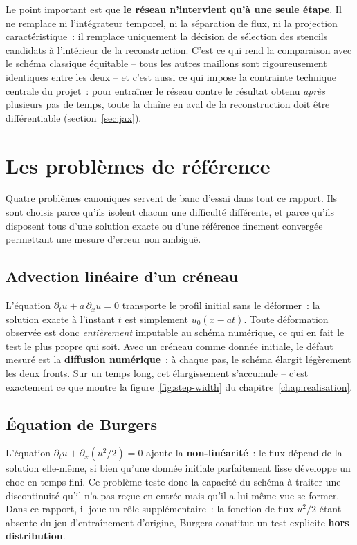 \documentclass[12pt,a4paper,oneside]{report}
\begin{document}
Le point important est que \textbf{le réseau n'intervient qu'à une seule
étape}. Il ne remplace ni l'intégrateur temporel, ni la séparation de flux, ni
la projection caractéristique~: il remplace uniquement la décision de
sélection des stencils candidats à l'intérieur de la reconstruction. C'est ce
qui rend la comparaison avec le schéma classique équitable -- tous les autres
maillons sont rigoureusement identiques entre les deux -- et c'est aussi ce qui
impose la contrainte technique centrale du projet~: pour entraîner le réseau
contre le résultat obtenu \emph{après} plusieurs pas de temps, toute la chaîne
en aval de la reconstruction doit être différentiable
(section~\ref{sec:jax}).

\section{Les problèmes de référence}
\label{sec:problemes}

Quatre problèmes canoniques servent de banc d'essai dans tout ce rapport. Ils
sont choisis parce qu'ils isolent chacun une difficulté différente, et parce
qu'ils disposent tous d'une solution exacte ou d'une référence finement
convergée permettant une mesure d'erreur non ambiguë.

\subsection{Advection linéaire d'un créneau}

L'équation $\partial_t u + a\,\partial_x u = 0$ transporte le profil initial
sans le déformer~: la solution exacte à l'instant $t$ est simplement
$u_0(x - at)$. Toute déformation observée est donc \emph{entièrement}
imputable au schéma numérique, ce qui en fait le test le plus propre qui soit.
Avec un créneau comme donnée initiale, le défaut mesuré est la
\textbf{diffusion numérique}~: à chaque pas, le schéma élargit légèrement les
deux fronts. Sur un temps long, cet élargissement s'accumule -- c'est
exactement ce que montre la figure~\ref{fig:step-width} du
chapitre~\ref{chap:realisation}.

\subsection{Équation de Burgers}

L'équation $\partial_t u + \partial_x (u^2/2) = 0$ ajoute la
\textbf{non-linéarité}~: le flux dépend de la solution elle-même, si bien
qu'une donnée initiale parfaitement lisse développe un choc en temps fini. Ce
problème teste donc la capacité du schéma à traiter une discontinuité qu'il n'a
pas reçue en entrée mais qu'il a lui-même vue se former. Dans ce rapport, il
joue un rôle supplémentaire~: la fonction de flux $u^2/2$ étant absente du jeu
d'entraînement d'origine, Burgers constitue un test explicite
\textbf{hors distribution}.
\end{document}
